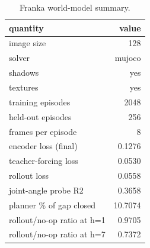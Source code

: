 \begin{table}[t]
\centering
\begin{tabular}{lr}
\toprule
quantity & value \\
\midrule
image size & 128 \\
solver & mujoco \\
shadows & yes \\
textures & yes \\
training episodes & 2048 \\
held-out episodes & 256 \\
frames per episode & 8 \\
encoder loss (final) & 0.1276 \\
teacher-forcing loss & 0.0530 \\
rollout loss & 0.0558 \\
joint-angle probe R2 & 0.3658 \\
planner \% of gap closed & 10.7074 \\
rollout/no-op ratio at h=1 & 0.9705 \\
rollout/no-op ratio at h=7 & 0.7372 \\
\bottomrule
\end{tabular}
\caption{Franka world-model summary.}
\label{tab:franka-summary}
\end{table}
